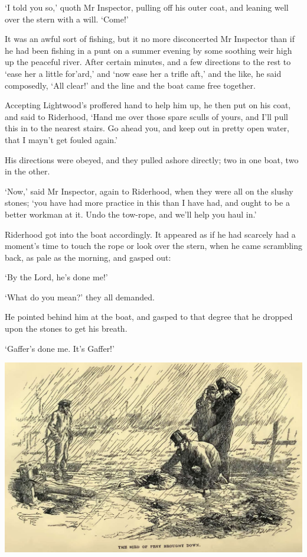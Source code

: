 ‘I told you so,’ quoth Mr Inspector, pulling off his outer coat, and
leaning well over the stern with a will. ‘Come!’

It was an awful sort of fishing, but it no more disconcerted Mr
Inspector than if he had been fishing in a punt on a summer evening by
some soothing weir high up the peaceful river. After certain minutes,
and a few directions to the rest to ‘ease her a little for’ard,’ and
‘now ease her a trifle aft,’ and the like, he said composedly, ‘All
clear!’ and the line and the boat came free together.

Accepting Lightwood’s proffered hand to help him up, he then put on his
coat, and said to Riderhood, ‘Hand me over those spare sculls of yours,
and I’ll pull this in to the nearest stairs. Go ahead you, and keep out
in pretty open water, that I mayn’t get fouled again.’

His directions were obeyed, and they pulled ashore directly; two in one
boat, two in the other.

‘Now,’ said Mr Inspector, again to Riderhood, when they were all on the
slushy stones; ‘you have had more practice in this than I have had, and
ought to be a better workman at it. Undo the tow-rope, and we’ll help
you haul in.’

Riderhood got into the boat accordingly. It appeared as if he had
scarcely had a moment’s time to touch the rope or look over the stern,
when he came scrambling back, as pale as the morning, and gasped out:

‘By the Lord, he’s done me!’

‘What do you mean?’ they all demanded.

He pointed behind him at the boat, and gasped to that degree that he
dropped upon the stones to get his breath.

‘Gaffer’s done me. It’s Gaffer!’

\includegraphics[scale=2.3]{01-14-01}

